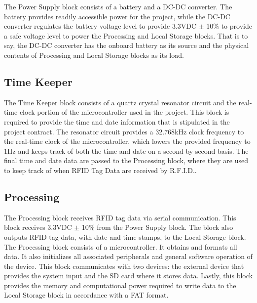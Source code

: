 The Power Supply block consists of a battery and a DC-DC converter. The battery provides readily accessible power for the project, while the DC-DC converter regulates the battery voltage level to provide 3.3VDC $\pm$ 10\% to provide a safe voltage level to power the Processing and Local Storage blocks. That is to say, the DC-DC converter has the onboard battery as its source and the physical contents of Processing and Local Storage blocks as its load.

\subsection{Time Keeper}
The Time Keeper block consists of a quartz crystal resonator circuit and the real-time clock portion of the microcontroller used in the project. This block is required to provide the time and date information that is stipulated in the project contract. The resonator circuit provides a 32.768kHz clock frequency to the real-time clock of the microcontroller, which lowers the provided frequency to 1Hz and keeps track of both the time and date on a second by second basis. The final time and date data are passed to the Processing block, where they are used to keep track of when RFID Tag Data are received by R.F.I.D..


\subsection{Processing}
 The Processing block receives RFID tag data via serial communication. This block receives 3.3VDC $\pm$ 10\% from the Power Supply block. The block also outputs RFID tag data, with date and time stamps, to the Local Storage block. The Processing block consists of a microcontroller. It obtains and formats all data. It also initializes all associated peripherals and general software operation of the device. This block communicates with two devices: the external device that provides the system input and the SD card where it stores data. Lastly, this block provides the memory and computational power required to write data to the Local Storage block in accordance with a FAT format.
 
 


